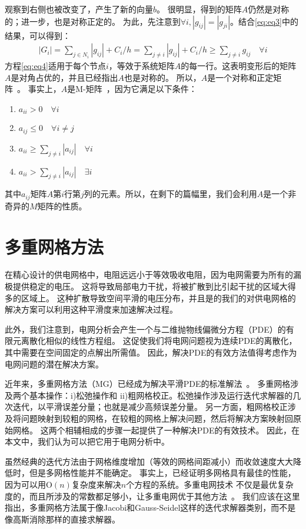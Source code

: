 观察到右侧也被改变了，产生了新的向量$b$。 很明显，得到的矩阵$A$仍然是对称的；进一步，也是对称正定的。 为此，先注意到$\forall i, |g_{ij}|=|g_{ji}|$。结合\ref{eq:eq3}中的结果，可以得到：
\begin{align}
|G_i| = \sum_{j\in N_i} |g_{ij}|+C_i/h=\sum_{j\neq i}|g_{ij}|+C_i/h\geq \sum_{j\neq i}g_{ij} \quad \forall i
\label{eq:eq4}
\end{align}
方程\ref{eq:eq4}适用于每个节点$i$，等效于系统矩阵$A$的每一行。这表明变形后的矩阵$A$是对角占优的，并且已经指出$A$也是对称的。 所以，$A$是一个对称和正定矩阵~\cite{golub2012matrix}。 事实上，$A$是M-矩阵~\cite{berman1994nonnegative}，因为它满足以下条件：
\begin{enumerate}
\item $a_{ii}>0 \quad \forall i$
\item $a_{ij}\leq 0 \quad \forall i\neq j$
\item $a_{ii}\geq \sum_{j\neq i}|a_{ij}| \quad \forall i$
\item $a_{ii}>\sum_{j\neq i}|a_{ij}| \quad \exists i$
\end{enumerate}
其中$a_{ij}$矩阵$A$第$i$行第$j$列的元素。所以，在剩下的篇幅里，我们会利用$A$是一个非奇异的$M$矩阵的性质。

\section{多重网格方法}

在精心设计的供电网格中，电阻远远小于等效吸收电阻，因为电网需要为所有的漏极提供稳定的电压。 这将导致局部电力干扰，将被扩散到比引起干扰的区域大得多的区域上。 这种扩散导致空间平滑的电压分布，并且是的我们的对供电网格的解决方案可以利用这种平滑度来加速解决过程。

此外，我们注意到，电网分析会产生一个与二维抛物线偏微分方程（PDE）的有限元离散化相似的线性方程组。 这促使我们将电网问题视为连续PDE的离散化，其中需要在空间固定的点解出所需值。 因此，解决PDE的有效方法值得考虑作为电网问题的潜在解决方案。

近年来，多重网格方法（MG）已经成为解决平滑PDE的标准解法~\cite{briggs2000multigrid,brandt1973multi,hackbusch2013multi}。 多重网格涉及两个基本操作：i)松弛操作和 ii)粗网格校正。松弛操作涉及运行迭代求解器的几次迭代，以平滑误差分量；也就是减少高频误差分量。 另一方面，粗网格校正涉及将问题映射到较粗的网格，在较粗的网格上解决问题，然后将解决方案映射回原始网格。 这两个相辅相成的步骤一起提供了一种解决PDE的有效技术。 因此，在本文中，我们认为可以把它用于电网分析中。

虽然经典的迭代方法由于网格维度增加（等效的网格间距减小）而收敛速度大大降低时，但是多网格性能并不能确定。 事实上，已经证明多网格具有最佳的性能，因为可以用O$(n)$复杂度来解决$n$个方程的系统。多重电网技术 不仅是最优复杂度的，而且所涉及的常数都足够小，让多重电网优于其他方法~\cite{hackbusch2013multi}。 我们应该在这里指出，多重网格方法属于像Jacobi和Gauss-Seidel这样的迭代求解器类别，而不是像高斯消除那样的直接求解器。

